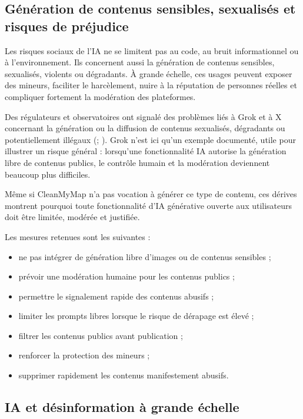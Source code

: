 \documentclass[
  10pt,
  a4paper,
  DIV=11,
  numbers=noendperiod,
  oneside]{scrreprt}
\providecommand{\tightlist}{%
  \setlength{\itemsep}{0pt}\setlength{\parskip}{0pt}}
\begin{document}
\subsection{Génération de contenus sensibles, sexualisés et risques de
préjudice}\label{guxe9nuxe9ration-de-contenus-sensibles-sexualisuxe9s-et-risques-de-pruxe9judice}

Les risques sociaux de l'IA ne se limitent pas au code, au bruit
informationnel ou à l'environnement. Ils concernent aussi la génération
de contenus sensibles, sexualisés, violents ou dégradants. À grande
échelle, ces usages peuvent exposer des mineurs, faciliter le
harcèlement, nuire à la réputation de personnes réelles et compliquer
fortement la modération des plateformes.

Des régulateurs et observatoires ont signalé des problèmes liés à Grok
et à X concernant la génération ou la diffusion de contenus sexualisés,
dégradants ou potentiellement illégaux
(;
). Grok n'est
ici qu'un exemple documenté, utile pour illustrer un risque général :
lorsqu'une fonctionnalité IA autorise la génération libre de contenus
publics, le contrôle humain et la modération deviennent beaucoup plus
difficiles.

Même si CleanMyMap n'a pas vocation à générer ce type de contenu, ces
dérives montrent pourquoi toute fonctionnalité d'IA générative ouverte
aux utilisateurs doit être limitée, modérée et justifiée.

Les mesures retenues sont les suivantes :

\begin{itemize}
\tightlist
\item
  ne pas intégrer de génération libre d'images ou de contenus sensibles
  ;
\item
  prévoir une modération humaine pour les contenus publics ;
\item
  permettre le signalement rapide des contenus abusifs ;
\item
  limiter les prompts libres lorsque le risque de dérapage est élevé ;
\item
  filtrer les contenus publics avant publication ;
\item
  renforcer la protection des mineurs ;
\item
  supprimer rapidement les contenus manifestement abusifs.
\end{itemize}

\subsection{IA et désinformation à grande
échelle}\label{ia-et-duxe9sinformation-uxe0-grande-uxe9chelle}
\end{document}
